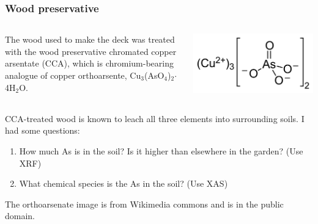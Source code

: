 \documentclass[10pt, xcolor=x11names, compress]{beamer}
\begin{document}
\begin{frame}
  \frametitle{Wood preservative}

  \begin{columns}[T]
    \begin{column}{0.6\linewidth}
      The wood used to make the deck was treated with the wood
      preservative chromated copper arsentate (CCA), which is
      chromium-bearing analogue of copper orthoarsente,
      Cu$_3$(AsO$_4$)$_2$$\cdot$4H$_2$O.
    \end{column}
    \begin{column}{0.4\linewidth}
      \includegraphics[width=\linewidth]{garden/copper_arsenate.png}      
    \end{column}
  \end{columns}

  \bigskip

  \begin{block}{}
    CCA-treated wood is known to leach all three elements into
    surrounding soils.  I had some questions:

    \bigskip

    \begin{enumerate}
    \item How much As is in the soil?  Is it higher than elsewhere
      in the garden? (Use XRF)
    \item What chemical species is the As in the soil?  (Use XAS)
    \end{enumerate}
  \end{block}
  \begin{bottomnote}[0.5][19.5]
    The orthoarsenate image is from Wikimedia commons and is in the
    public domain.
  \end{bottomnote}
\end{frame}
\end{document}
